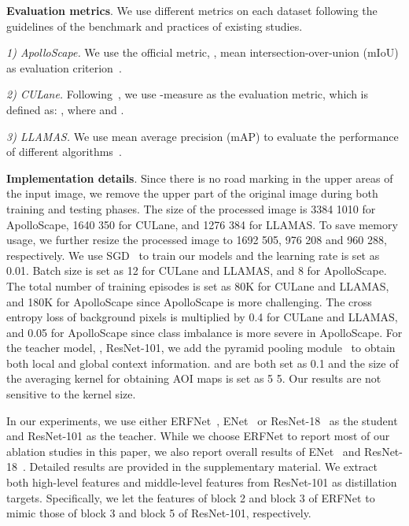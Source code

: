\documentclass[10pt,twocolumn,letterpaper]{article}
\begin{document}
\noindent
\textbf{Evaluation metrics}. We use different metrics on each dataset following the guidelines of the benchmark and practices of existing studies.

\noindent \textit{1) ApolloScape.} We use the official metric, \ie, mean intersection-over-union (mIoU) as evaluation criterion~\cite{huang2018apolloscape}.

\noindent \textit{2) CULane.} Following~\cite{pan2017spatial}, we use -measure as the evaluation metric, which is defined as: ,
where  and .

\noindent \textit{3) LLAMAS.} We use mean average precision (mAP) to evaluate the performance of different algorithms~\cite{llamas2019}.

\noindent
\textbf{Implementation details}.
Since there is no road marking in the upper areas of the input image, we remove the upper part of the original image during both training and testing phases. The size of the processed image is 3384  1010 for ApolloScape, 1640  350 for CULane, and 1276  384 for LLAMAS. 
To save memory usage, we further resize the processed image to 1692  505, 976  208 and 960  288, respectively. We use SGD~\cite{bottou2010large} to train our models and the learning rate is set as 0.01. Batch size is set as 12 for CULane and LLAMAS, and 8 for ApolloScape. The total number of training episodes is set as 80K for CULane and LLAMAS, and 180K for ApolloScape since ApolloScape is more challenging. The cross entropy loss of background pixels is multiplied by 0.4 for CULane and LLAMAS, and 0.05 for ApolloScape since class imbalance is more severe in ApolloScape. For the teacher model, \ie, ResNet-101, we add the pyramid pooling module~\cite{zhao2017pyramid} to obtain both local and global context information.  and  are both set as 0.1 and the size of the averaging kernel for obtaining AOI maps is set as 5  5. Our results are not sensitive to the kernel size. 

In our experiments, we use either ERFNet~\cite{romera2017erfnet}, ENet~\cite{paszke2016enet} or ResNet-18~\cite{he2016deep} as the student and ResNet-101 as the teacher. While we choose ERFNet to report most of our ablation studies in this paper, we also report overall results of ENet~\cite{paszke2016enet} and ResNet-18~\cite{he2016deep}. Detailed results are provided in the supplementary material.
We extract both high-level features and middle-level features from ResNet-101 as distillation targets. Specifically, we let the features of block 2 and block 3 of ERFNet to mimic those of block 3 and block 5 of ResNet-101, respectively.
\end{document}
